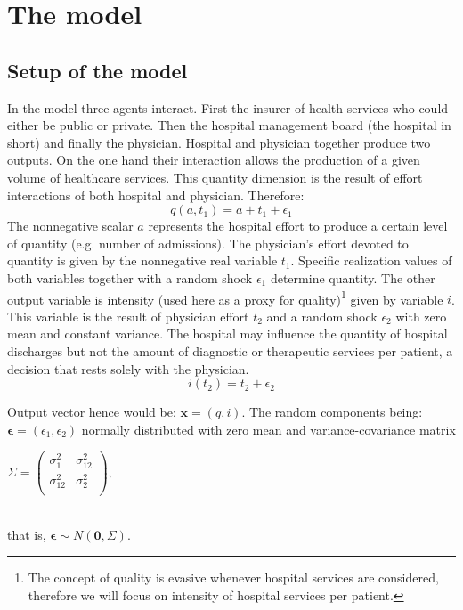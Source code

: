\documentclass[12pt,letterpaper]{article}
\begin{document}
\section{The model}

\subsection{Setup of the model}
In the model three agents interact. First the insurer of health services who could either be public or private. Then the hospital management board (the hospital in short) and finally the physician. Hospital and physician together produce two outputs. On the one hand their interaction allows the production of a given volume of healthcare services. This quantity dimension is the result of effort interactions of both hospital and physician. Therefore:
\begin{equation*}\label{eq:q}
  q(a,t_1)=a+t_1+\epsilon_1
\end{equation*}
The nonnegative scalar $a$ represents the hospital effort to produce a certain level of quantity (e.g. number of admissions). The physician's effort devoted to quantity is given by the nonnegative real variable $t_1$. Specific realization values of both variables together with a random shock $\epsilon_1$ determine quantity.
The other output variable is intensity (used here as a proxy for quality)\footnote{The concept of quality is evasive whenever hospital services are considered, therefore we will focus on intensity of hospital services per patient. } given by variable $i$. This variable is the result of physician effort $t_2$ and a random shock $\epsilon_2$ with zero mean and constant variance. The hospital may influence the quantity of hospital discharges but not the amount of diagnostic or therapeutic services per patient, a decision that rests solely with the physician.
\begin{equation*}\label{eq:i}
  i(t_2)=t_2+\epsilon_2
\end{equation*}

Output vector hence would be: $ \mathbold{x}=(q,i) $. The random components being: $
\mathbold{\epsilon}=(\epsilon_1, \epsilon_2)$ normally distributed with zero mean and variance-covariance matrix  \\ \centerline{$ \Sigma=\begin{pmatrix}
  \sigma^2_1 & \sigma^2_{12} \\
  \sigma^2_{12} & \sigma^2_2 \\
\end{pmatrix}, $}\\
that is,  $ \mathbold{\epsilon}\sim N(\mathbf{0},\Sigma) $.
\end{document}
